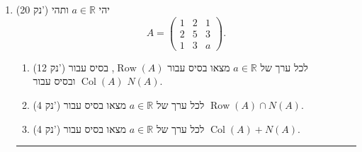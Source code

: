 \documentclass[12pt, a4paper]{article}
\newcommand{\rr}{\mathbb{R}}
\newcommand{\im}{\mathrm{Im}}
\newcommand{\points}[1]{(#1 נק') }
\DeclareMathOperator{\row}{Row}
\DeclareMathOperator{\col}{Col}
\begin{document}
\begin{enumerate}
{\begin{enumerate}
\item\points{8}
מצאו נוסחה עבור
$$T\begin{pmatrix}
a\\
b\\
c
\end{pmatrix}$$

\item\points{8}
מצאו בסיס אורתונורמלי עבור
$\ker(T)$
ובסיס אורתונורמלי עבור
$\im(T)$.

\item\points{4}
האם קיימים
$v_1,v_2\in\rr^3$
כך ש-
$v_1\neq v_2$
וגם
$T(v_1)=T(v_2)$?
נמקו.
\end{enumerate}

}
\secondQ

\pagebreak

\newcommand{\thirdQ}{

\item\points{20}
יהי
$a\in\rr$
ותהי
$$A=
\begin{pmatrix}
1&2&1\\
2&5&3\\
1&3&a
\end{pmatrix}.$$

\begin{enumerate}
\item\points{12}
לכל ערך של
$a\in\rr$
מצאו בסיס עבור
$\row(A)$,
בסיס עבור
$\col(A)$
ובסיס עבור
$N(A)$.

\item\points{4}
לכל ערך של
$a\in\rr$
מצאו בסיס עבור
$\row(A)\cap N(A)$.

\item\points{4}
לכל ערך של
$a\in\rr$
מצאו בסיס עבור
$\col(A)+N(A)$.
\end{enumerate}

}
\thirdQ

\noindent\rule{\textwidth-30pt}{0.4pt}
\newcommand{\forthQ}{

\item\points{20}
ענו על שני הסעיפים הבאים.

\begin{enumerate}
\item\points{10}
תהי
$T:\rr^n\to\rr^n$
העתקה לינארית המקיימת
$T( T(v))={0}$
לכל
$v\in \rr^n$.

הוכיחו כי
$\im(T)\subseteq \ker(T)$
והסיקו כי
$\dim(\im(T))\leq \frac{n}{2}$

\bigskip

\item\points{10}
תהי
$T:V\to W$
העתקה לינארית חד-חד ערכית,


\end{enumerate}}
\end{enumerate}
\end{document}
